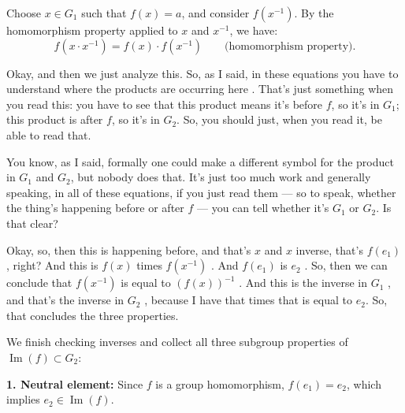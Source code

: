 \begin{proofWrapper}
\begin{content}
Choose $x \in G_1$ such that $f(x) = a$, and consider $f(x^{-1})$. By the homomorphism property applied to $x$ and $x^{-1}$, we have:
\begin{equation}\label{eq:hom-inv-setup}
f(x \cdot x^{-1}) = f(x) \cdot f(x^{-1}) \qquad \text{(homomorphism property)}.
\end{equation}
\end{content}

\begin{speech}[00:04:34 - 00:05:53]
Okay, and then we just analyze this. So, as I said, in these equations you have to understand where the products are occurring here . That's just something when you read this: you have to see that this product  means it's before $f$, so it's in $G_1$; this product  is after $f$, so it's in $G_2$. So, you should just, when you read it, be able to read that.

You know, as I said, formally one could make a different symbol for the product in $G_1$ and $G_2$, but nobody does that. It's just too much work and generally speaking, in all of these equations, if you just read them --- so to speak, whether the thing's happening before or after $f$ --- you can tell whether it's $G_1$ or $G_2$. Is that clear?

Okay, so, then this is happening before, and that's $x$ and $x$ inverse, that's $f(e_1)$, right? And this is $f(x)$ times $f(x^{-1})$ . And $f(e_1)$ is $e_2$ . So, then we can conclude that $f(x^{-1})$ is equal to $(f(x))^{-1}$ . And this is the inverse in $G_1$ , and that's the inverse in $G_2$ , because I have that times that is equal to $e_2$. So, that concludes the three properties.
\end{speech}

\begin{content}
We finish checking inverses and collect all three subgroup properties of $\operatorname{Im}(f) \subset G_2$:

\textbf{1. Neutral element:} Since $f$ is a group homomorphism, $f(e_1) = e_2$, which implies $e_2 \in \operatorname{Im}(f)$.


\end{content}
\end{proofWrapper}
